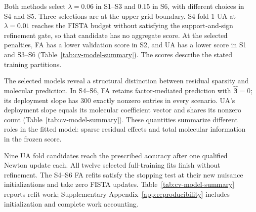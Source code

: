 Both methods select $\lambda=0.06$ in S1--S3 and $0.15$ in S6, with different choices in S4 and S5. Three selections are at the upper grid boundary. S4 fold 1 UA at $\lambda=0.01$ reaches the FISTA budget without satisfying the support-and-sign refinement gate, so that candidate has no aggregate score. At the selected penalties, FA has a lower validation score in S2, and UA has a lower score in S1 and S3--S6 (Table~\ref{tab:cv-model-summary}). The scores describe the stated training partitions.

The selected models reveal a structural distinction between residual sparsity and molecular prediction. In S4--S6, FA retains factor-mediated prediction with $\widehat{\bm{\beta}}=0$; its deployment slope has 300 exactly nonzero entries in every scenario. UA's deployment slope equals its molecular coefficient vector and shares its nonzero count (Table~\ref{tab:cv-model-summary}). These quantities summarize different roles in the fitted model: sparse residual effects and total molecular information in the frozen score.


Nine UA fold candidates reach the prescribed accuracy after one qualified Newton update each. All twelve selected full-training fits finish without refinement. The S4--S6 FA refits satisfy the stopping test at their new nuisance initializations and take zero FISTA updates. Table~\ref{tab:cv-model-summary} reports refit work; Supplementary Appendix~\ref{app:reproducibility} includes initialization and complete work accounting.
\FloatBarrier
